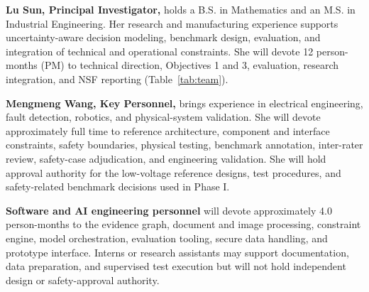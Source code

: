 \documentclass[11pt,letterpaper]{article}
\begin{document}
\textbf{Lu Sun, Principal Investigator,} holds a B.S. in Mathematics and an M.S. in Industrial Engineering. Her research and manufacturing experience supports uncertainty-aware decision modeling, benchmark design, evaluation, and integration of technical and operational constraints. She will devote 12 person-months (PM) to technical direction, Objectives 1 and 3, evaluation, research integration, and NSF reporting (Table~\ref{tab:team}).

\textbf{Mengmeng Wang, Key Personnel,} brings experience in electrical engineering, fault detection, robotics, and physical-system validation. She will devote approximately full time to reference architecture, component and interface constraints, safety boundaries, physical testing, benchmark annotation, inter-rater review, safety-case adjudication, and engineering validation. She will hold approval authority for the low-voltage reference designs, test procedures, and safety-related benchmark decisions used in Phase I.

\textbf{Software and AI engineering personnel} will devote approximately 4.0 person-months to the evidence graph, document and image processing, constraint engine, model orchestration, evaluation tooling, secure data handling, and prototype interface. Interns or research assistants may support documentation, data preparation, and supervised test execution but will not hold independent design or safety-approval authority.
\end{document}
